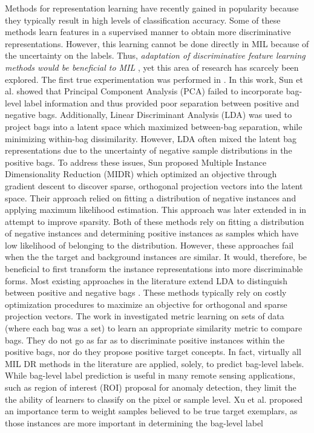 Methods for representation learning have recently gained in popularity because they typically result in high levels of classification accuracy.  Some of these methods  learn features in a supervised manner to obtain more discriminative representations.  However, this learning cannot be done directly in  MIL because of the uncertainty on the labels.  Thus, \textit{adaptation of discriminative  feature learning methods would be beneficial to MIL} \cite{Carbonneau2016MILSurvey}, yet this area of research has scarcely been explored.  The first true experimentation was performed in \cite{Sun2010MIDR}.  In this work, Sun et al. showed that Principal Component Analysis (PCA) failed to incorporate bag-level label information and thus provided poor separation between positive and negative bags.  Additionally, Linear Discriminant Analysis (LDA) was used to project bags into a latent space which maximized between-bag separation, while minimizing within-bag dissimilarity.  However, LDA often mixed the latent bag representations due to the uncertainty of negative sample distributions in the positive bags.  To address these issues, Sun proposed Multiple Instance Dimensionality Reduction (MIDR) which optimized an objective through gradient descent to discover sparse, orthogonal projection vectors into the latent space.  Their approach relied on fitting a distribution of negative instances and applying maximum likelihood estimation.  This approach was later extended in \cite{Zhu2018MIDRSparsity} in attempt to improve sparsity.  Both of these methods rely on fitting a distribution of negative instances and determining positive instances as samples which have low likelihood of belonging to the distribution.  However, these approaches fail when the the target and background instances are similar.  It would, therefore, be beneficial to first transform the instance representations into more discriminable forms.  Most existing approaches in the literature extend LDA to distinguish between positive and negative bags \cite{Chai2014MIDA,Zhu2018MIDRSparsity}.  These methods typically rely on costly optimization procedures to maximize an objective for orthogonal and sparse projection vectors.  The work in \cite{Xu2011MI_Metric_Learning} investigated metric learning on sets of data (where each bag was a set) to learn an appropriate similarity metric to compare bags.  They do not go as far as to discriminate positive instances within the positive bags, nor do they propose positive target concepts.  In fact, virtually all MIL DR methods in the literature are applied, solely, to predict bag-level labels. While bag-level label prediction is useful in many remote sensing applications, such as region of interest (ROI) proposal for anomaly detection, they limit the the ability of learners to classify on the pixel or sample level.  Xu et al. proposed an importance term to weight samples believed to be true target exemplars, as those instances are more important in determining the bag-level label 